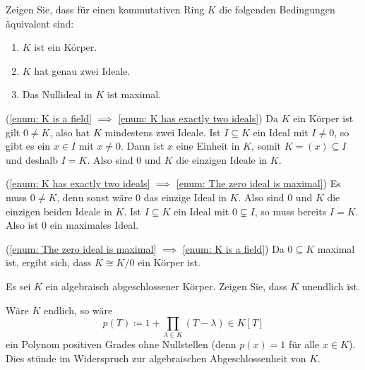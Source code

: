 \begin{question}
  \label{question: characterization of fields via its ideals}
  Zeigen Sie, dass für einen kommutativen Ring $K$ die folgenden Bedingungen äquivalent sind:
  \begin{enumerate}
    \item
      \label{enum: K is a field}
      $K$ ist ein Körper.
    \item
      \label{enum: K has exactly two ideals}
      $K$ hat genau zwei Ideale.
    \item
      \label{enum: The zero ideal is maximal}
      Das Nullideal in $K$ ist maximal.
  \end{enumerate}
\end{question}


\begin{solution}
  (\ref{enum: K is a field} $\implies$ \ref{enum: K has exactly two ideals})
  Da $K$ ein Körper ist gilt $0 \neq K$, also hat $K$ mindestens zwei Ideale.
  Ist $I \subseteq K$ ein Ideal mit $I \neq 0$, so gibt es ein $x \in I$ mit $x \neq 0$.
  Dann ist $x$ eine Einheit in $K$, somit $K = (x) \subseteq I$ und deshalb $I = K$.
  Also sind $0$ und $K$ die einzigen Ideale in $K$.
  
  (\ref{enum: K has exactly two ideals} $\implies$ \ref{enum: The zero ideal is maximal})
  Es muss $0 \neq K$, denn sonst wäre $0$ das einzige Ideal in $K$.
  Also sind $0$ und $K$ die einzigen beiden Ideale in $K$.
  Ist $I \subseteq K$ ein Ideal mit $0 \subsetneq I$, so muss bereits $I = K$.
  Also ist $0$ ein maximales Ideal.
  
  (\ref{enum: The zero ideal is maximal} $\implies$ \ref{enum: K is a field})
  Da $0 \subseteq K$ maximal ist, ergibt sich, dass $K \cong K/0$ ein Körper ist.
\end{solution}


\begin{question}
  Es sei $K$ ein algebraisch abgeschlossener Körper.
  Zeigen Sie, dass $K$ unendlich ist.
\end{question}


\begin{solution}
  Wäre $K$ endlich, so wäre
  \[
              p(T)
    \coloneqq 1 + \prod_{\lambda \in K} (T - \lambda)
    \in       K[T]
  \]
  ein Polynom positiven Grades ohne Nullstellen (denn $p(x) = 1$ für alle $x \in K$).
  Dies stünde im Widerspruch zur algebraischen Abgeschlossenheit von $K$.
\end{solution}



